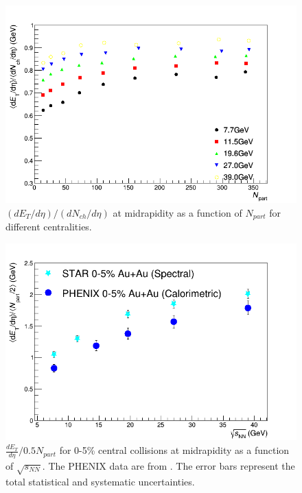 	\begin{figure}[h]
	  \centering
	  \includegraphics[width=5.5in]{figures/finalStacked/dETdEtaOverdNchdEtaSumEn39.0s.png}
	  \caption{$(dE_{T}/d\eta)/(dN_{ch}/d\eta)$ at midrapidity as a function of ${N_{part}}$ for different centralities.}\label{fig:dETdEtaOverdNchdEtaSumEn}
	\end{figure}
		
	\begin{figure}[h]
	  \centering
	  \includegraphics[width=4.5in]{figures/PHENIX_comparison2.png}
	  \caption{$\frac{dE_{T}}{d\eta}/0.5N_{part}$ for 0-5\% central collisions at midrapidity as a function of $\sqrt{s_{NN}}$. The PHENIX data are from \cite{PhysRevC.93.024901}. The error bars represent the total statistical and systematic uncertainties.}\label{fig:comparison}
	\end{figure}
	
	
	
